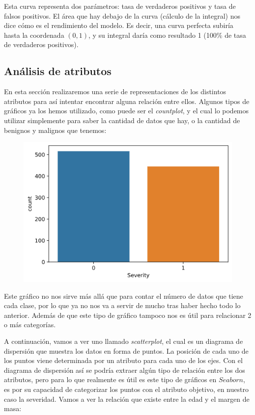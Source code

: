 \documentclass[11pt,a4paper]{article}
\begin{document}
Esta curva representa dos parámetros: tasa de verdaderos positivos y tasa de falsos positivos. El área que hay debajo de la curva
(cálculo de la integral) nos dice cómo es el rendimiento del modelo. Es decir, una curva perfecta subiría hasta la coordenada
$(0,1)$, y su integral daría como resultado 1 (100\% de tasa de verdaderos positivos).


\subsection{Análisis de atributos}
En esta sección realizaremos una serie de representaciones de los distintos atributos para así intentar encontrar alguna relación
entre ellos. Algunos tipos de gráficos ya los hemos utilizado, como puede ser el \textit{countplot}, y el cual lo podemos utilizar
simplemente para saber la cantidad de datos que hay, o la cantidad de benignos y malignos que tenemos:

\begin{figure}[H]
    \centering
    \includegraphics[scale=0.5]{img/severity-count.png}
\end{figure}

Este gráfico no nos sirve más allá que para contar el número de datos que tiene cada clase, por lo que ya no nos va a servir de
mucho tras haber hecho todo lo anterior. Además de que este tipo de gráfico tampoco nos es útil para relacionar 2 o más categorías.

A continuación, vamos a ver uno llamado \textit{scatterplot}, el cual es un diagrama de dispersión que muestra los datos en forma
de puntos. La posición de cada uno de los puntos viene determinada por un atributo para cada uno de los ejes. Con el diagrama de
dispersión así se podría extraer algún tipo de relación entre los dos atributos, pero para lo que realmente es útil es este tipo
de gráficos en $Seaborn$, es por su capacidad de categorizar los puntos con el atributo objetivo, en nuestro caso la severidad.
Vamos a ver la relación que existe entre la edad y el margen de masa:
\end{document}
